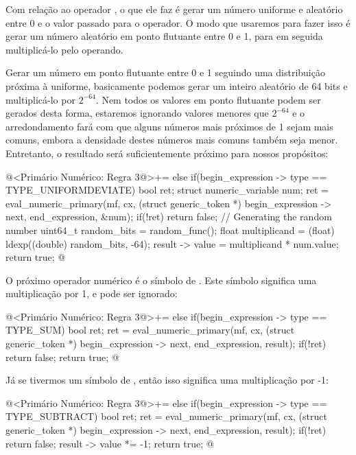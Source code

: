 Com relação ao operador , o que ele faz é
gerar um número uniforme e aleatório entre 0 e o valor passado para o
operador. O modo que usaremos para fazer isso é gerar um número
aleatório em ponto flutuante entre 0 e 1, para em seguida
multiplicá-lo pelo operando.

Gerar um número em ponto flutuante entre 0 e 1 seguindo uma
distribuição próxima à uniforme, basicamente podemos gerar um inteiro
aleatório de 64 bits e multiplicá-lo por $2^{-64}$. Nem todos os valores
em ponto flutuante podem ser gerados desta forma, estaremos ignorando
valores menores que $2^{-64}$ e o arredondamento fará com que alguns
números mais próximos de 1 sejam mais comuns, embora a densidade
destes números mais comuns também seja menor. Entretanto, o resultado
será suficientemente próximo para nossos propósitos:

\iniciocodigo
@<Primário Numérico: Regra 3@>+=
else if(begin_expression -> type == TYPE_UNIFORMDEVIATE){
  bool ret;
  struct numeric_variable num;
  ret = eval_numeric_primary(mf, cx, (struct generic_token *)
                             begin_expression -> next,
                             end_expression, &num);
  if(!ret)
    return false;
  { // Generating the random number
    uint64_t random_bits = random_func();
    float multiplicand = (float) ldexp((double) random_bits, -64);
    result -> value = multiplicand * num.value;
  }
  return true;
}
@
\fimcodigo

O próximo operador numérico é o símbolo de \monoespaco{+}. Este
símbolo significa uma multiplicação por 1, e pode ser ignorado:

\iniciocodigo
@<Primário Numérico: Regra 3@>+=
else if(begin_expression -> type == TYPE_SUM){
  bool ret;
  ret = eval_numeric_primary(mf, cx, (struct generic_token *)
                             begin_expression -> next,
                             end_expression, result);
  if(!ret)
    return false;
  return true;
}
@
\fimcodigo

Já se tivermos um símbolo de \monoespaco{-}, então isso significa uma
multiplicação por -1:

\iniciocodigo
@<Primário Numérico: Regra 3@>+=
else if(begin_expression -> type == TYPE_SUBTRACT){
  bool ret;
  ret = eval_numeric_primary(mf, cx, (struct generic_token *)
                             begin_expression -> next,
                             end_expression, result);
  if(!ret)
    return false;
  result -> value *= -1;
  return true;
}
@
\fimcodigo



